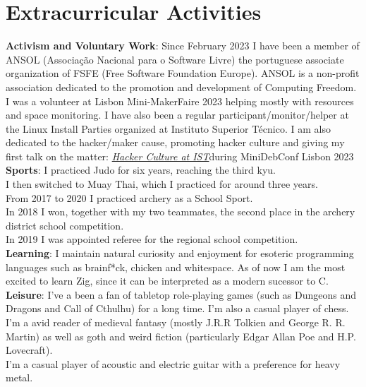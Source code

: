 \documentclass[singlesided,
               paper=a4,
               fontsize=9.3pt
              ]{my-resume}
\begin{document}
{    \section{Extracurricular Activities}
        \textbf{Activism and Voluntary Work}: Since February 2023 I have been a member of ANSOL (Associação Nacional para o Software Livre) the portuguese associate organization of FSFE (Free Software Foundation Europe). ANSOL is a non-profit association dedicated to the promotion and development of Computing Freedom. I was a volunteer at Lisbon Mini-MakerFaire 2023 helping mostly with resources and space monitoring. I have also been a regular participant/monitor/helper at the Linux Install Parties organized at Instituto Superior Técnico. I am also dedicated to the hacker/maker cause, promoting hacker culture and giving my first talk on the matter: \href{https://pt2023.mini.debconf.org/talks/26-hacker-culture-at-ist-the-hswatch-example/}{\textit{Hacker Culture at IST}}during MiniDebConf Lisbon 2023
        \\[0.2cm] \textbf{Sports}:
        I practiced Judo for six years, reaching the third kyu.\\
        I then switched to Muay Thai, which I practiced for around three years.\\
        From 2017 to 2020 I practiced archery as a School Sport.\\
        In 2018 I won, together with my two teammates, the second place in the archery district school competition.\\ 
        In 2019 I was appointed referee for the regional school competition.
        \\[0.2cm] \textbf{Learning}: I maintain natural curiosity and enjoyment for esoteric programming languages such as brainf*ck, chicken and whitespace. As of now I am the most excited to learn Zig, since it can be interpreted as a modern sucessor to C.
        \\[0.2cm] \textbf{Leisure}: I've a been a fan of tabletop role-playing games (such as Dungeons and Dragons and Call of Cthulhu) for a long time. I'm also a casual player of chess.\\
        I'm a avid reader of medieval fantasy (mostly J.R.R Tolkien and George R. R. Martin) as well as goth and weird fiction (particularly Edgar Allan Poe and H.P. Lovecraft).\\
        I'm a casual player of acoustic and electric guitar with a preference for heavy metal.
        
}
\makebody
\end{document}
